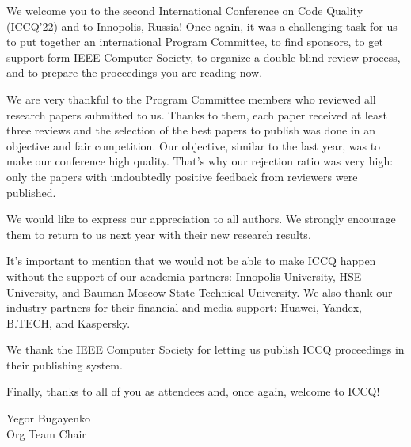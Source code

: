 
\cleardoublepage
{}

We welcome you to the second International Conference on Code Quality (ICCQ'22)
and to Innopolis, Russia! Once again, it was a challenging task for us
to put together an international Program Committee,
to find sponsors,
to get support form IEEE Computer Society,
to organize a double-blind review process,
and to prepare the proceedings you are reading now.

We are very thankful to the Program Committee members who
reviewed all research papers submitted to us. Thanks to them,
each paper received at least three reviews and the selection of the best papers to publish
was done in an objective and fair competition. Our objective,
similar to the last year, was to make our conference high quality.
That's why our rejection ratio was very high: only the
papers with undoubtedly positive feedback from reviewers were published.

We would like to express our appreciation to all authors.
We strongly encourage them to return to us next year
with their new research results.

It's important to mention that we would not be able to make
ICCQ happen without the support of our academia partners:
Innopolis University,
HSE University,
and
Bauman Moscow State Technical University.
We also thank our industry partners for their financial and media support:
Huawei, Yandex, B.TECH, and Kaspersky.

We thank the IEEE Computer Society for letting us publish ICCQ proceedings
in their publishing system.

Finally, thanks to all of you as attendees and, once again, welcome to ICCQ!

\vspace{18pt}
Yegor Bugayenko\\
Org Team Chair
